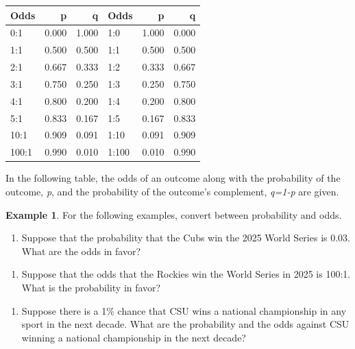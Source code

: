 \documentclass[
  11pt,
]{book}
\providecommand{\tightlist}{%
  \setlength{\itemsep}{0pt}\setlength{\parskip}{0pt}}
\theoremstyle{definition}
\theoremstyle{definition}
\newtheorem{example}{Example}[chapter]
\theoremstyle{definition}
\theoremstyle{definition}
\theoremstyle{remark}
\begin{document}
\begin{table}[H]
\centering
\begin{tabular}{lrrlrr}
\toprule
Odds & p & q & Odds & p & q\\
\midrule
0:1 & 0.000 & 1.000 & 1:0 & 1.000 & 0.000\\
1:1 & 0.500 & 0.500 & 1:1 & 0.500 & 0.500\\
2:1 & 0.667 & 0.333 & 1:2 & 0.333 & 0.667\\
3:1 & 0.750 & 0.250 & 1:3 & 0.250 & 0.750\\
4:1 & 0.800 & 0.200 & 1:4 & 0.200 & 0.800\\
5:1 & 0.833 & 0.167 & 1:5 & 0.167 & 0.833\\
10:1 & 0.909 & 0.091 & 1:10 & 0.091 & 0.909\\
100:1 & 0.990 & 0.010 & 1:100 & 0.010 & 0.990\\
\bottomrule
\end{tabular}
\end{table}

In the following table, the odds of an outcome along with the probability of the outcome, \emph{p}, and the probability of the outcome's complement, \emph{q=1-p} are given.

\newpage

\begin{example}
For the following examples, convert between probability and odds.
\end{example}

\begin{enumerate}
\def\labelenumi{(\alph{enumi})}
\tightlist
\item
  Suppose that the probability that the Cubs win the 2025 World Series is 0.03. What are the odds in favor?\\
\end{enumerate}

\vfill

\begin{enumerate}
\def\labelenumi{(\alph{enumi})}
\setcounter{enumi}{1}
\tightlist
\item
  Suppose that the odds that the Rockies win the World Series in 2025 is 100:1. What is the probability in favor?\\
\end{enumerate}

\vfill

\begin{enumerate}
\def\labelenumi{(\alph{enumi})}
\setcounter{enumi}{2}
\tightlist
\item
  Suppose there is a 1\% chance that CSU wins a national championship in any sport in the next decade. What are the probability and the odds against CSU winning a national championship in the next decade?\\
\end{enumerate}
\end{document}
